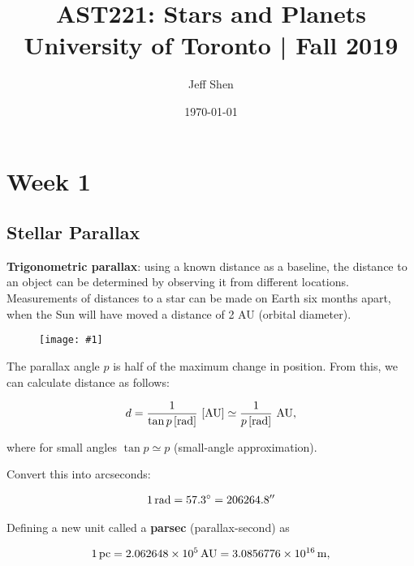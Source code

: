 \documentclass[a4paper,10pt]{article}
\newcommand{\fig}[1]{\centerline{\texttt{[image: \#1]}}}
\begin{document}
\title{AST221: Stars and Planets\\
    \Large University of Toronto | Fall 2019}
\author{Jeff Shen}
\date{\today}
\maketitle
\tableofcontents



\newpage
\section{Week 1}

\subsection{Stellar Parallax}

\textbf{Trigonometric parallax}: using a known distance as a baseline, the distance to an object can be determined by observing it from different locations. Measurements of distances to a star can be made on Earth six months apart, when the Sun will have moved a distance of 2 AU (orbital diameter). 

\begin{figure}[h]
    \fig{parallax}
\end{figure}

The parallax angle $p$ is half of the maximum change in position. From this, we can calculate distance as follows:

\begin{align*}
    d = \frac{1}{\tan p\,[{\rm rad}]}~[{\rm AU}] \simeq \frac{1}{p\,[{\rm rad}]}~{\rm AU},
\end{align*}

where for small angles $\tan p \simeq p$ (small-angle approximation). 

Convert this into arcseconds: 

\begin{align*}
    1\,{\rm rad} = 57.3^\circ = 206264.8''
\end{align*}

Defining a new unit called a \textbf{parsec} (parallax-second) as

\begin{align*}
    1\,{\rm pc} = 2.062648 \times 10^5\,{\rm AU} = 3.0856776 \times 10^{16}\,{\rm m},
\end{align*}
\end{document}
